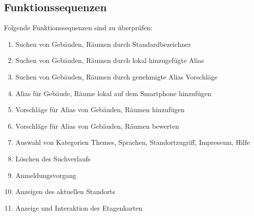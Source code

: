 \subsection{Funktionssequenzen}

Folgende Funktionssequenzen sind zu überprüfen:
\begin{enumerate}[label=\textbf{/T\arabic*0/}, align=left]
	\item Suchen von Gebäuden, Räumen durch Standardbezeichner
	\item Suchen von Gebäuden, Räumen durch lokal hinzugefügte Alias
	\item Suchen von Gebäuden, Räumen durch genehmigte Alias Vorschläge
	\item Alias für Gebäude, Räume lokal auf dem Smartphone hinzufügen
	\item Vorschläge für Alias von Gebäuden, Räumen hinzufügen
	\item Vorschläge für Alias von Gebäuden, Räumen bewerten
	\item Auswahl von Kategorien Themes, Sprachen, Standortzugriff, Impressum, Hilfe
	\item Löschen des Suchverlaufs
	\item Anmeldungsvorgang
	\item Anzeigen des aktuellen Standorts
	\item Anzeige und Interaktion der Etagenkarten

\end{enumerate}